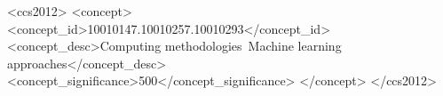 \documentclass[acmtog, authorversion]{acmart}
\begin{document}


% 
% 

\begin{CCSXML}
    <ccs2012>
        <concept>
            <concept_id>10010147.10010257.10010293</concept_id>
            <concept_desc>Computing methodologies~Machine learning approaches</concept_desc>
            <concept_significance>500</concept_significance>
            </concept>
    </ccs2012>
\end{CCSXML}
\end{document}
